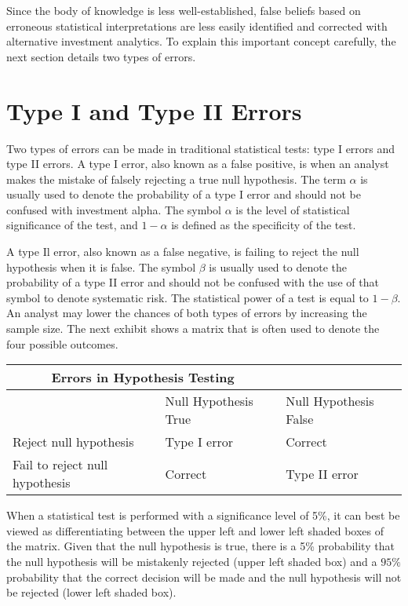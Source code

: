 \documentclass[11pt]{article}
\begin{document}
Since the body of knowledge is less well-established, false beliefs based on erroneous statistical interpretations are less easily identified and corrected with alternative investment analytics. To explain this important concept carefully, the next section details two types of errors.

\section*{Type I and Type II Errors}
Two types of errors can be made in traditional statistical tests: type I errors and type II errors. A type I error, also known as a false positive, is when an analyst makes the mistake of falsely rejecting a true null hypothesis. The term $\alpha$ is usually used to denote the probability of a type I error and should not be confused with investment alpha. The symbol $\alpha$ is the level of statistical significance of the test, and $1-\alpha$ is defined as the specificity of the test.

A type Il error, also known as a false negative, is failing to reject the null hypothesis when it is false. The symbol $\beta$ is usually used to denote the probability of a type II error and should not be confused with the use of that symbol to denote systematic risk. The statistical power of a test is equal to $1-\beta$. An analyst may lower the chances of both types of errors by increasing the sample size. The next exhibit shows a matrix that is often used to denote the four possible outcomes.

\begin{center}
\begin{tabular}{|l|l|l|}
\hline
\multicolumn{2}{|c|}{Errors in Hypothesis Testing} &  \\
\hline
 & Null Hypothesis True & Null Hypothesis False \\
\hline
Reject null hypothesis & Type I error & Correct \\
\cline { 3 - 3 }
Fail to reject null hypothesis & Correct & Type II error \\
\hline
\end{tabular}
\end{center}

When a statistical test is performed with a significance level of 5\%, it can best be viewed as differentiating between the upper left and lower left shaded boxes of the matrix. Given that the null hypothesis is true, there is a 5\% probability that the null hypothesis will be mistakenly rejected (upper left shaded box) and a $95 \%$\\
probability that the correct decision will be made and the null hypothesis will not be rejected (lower left shaded box).
\end{document}
